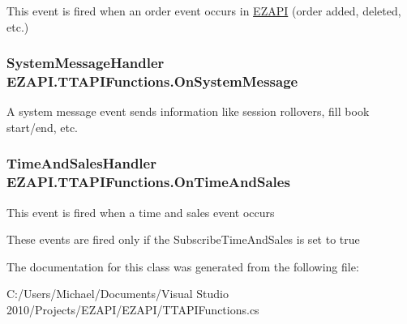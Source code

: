 This event is fired when an order event occurs in \hyperlink{namespace_e_z_a_p_i}{E\-Z\-A\-P\-I} (order added, deleted, etc.) 

\hypertarget{class_e_z_a_p_i_1_1_t_t_a_p_i_functions_a079bc7aa0ce092659ee404fdb2f32583}{
\subsubsection[{On\-System\-Message}]{\setlength{\rightskip}{0pt plus 5cm}System\-Message\-Handler E\-Z\-A\-P\-I.\-T\-T\-A\-P\-I\-Functions.\-On\-System\-Message}}\label{class_e_z_a_p_i_1_1_t_t_a_p_i_functions_a079bc7aa0ce092659ee404fdb2f32583}


A system message event sends information like session rollovers, fill book start/end, etc. 

\hypertarget{class_e_z_a_p_i_1_1_t_t_a_p_i_functions_a9e6460696db8d8d8e9e1723b887c63b7}{
\subsubsection[{On\-Time\-And\-Sales}]{\setlength{\rightskip}{0pt plus 5cm}Time\-And\-Sales\-Handler E\-Z\-A\-P\-I.\-T\-T\-A\-P\-I\-Functions.\-On\-Time\-And\-Sales}}\label{class_e_z_a_p_i_1_1_t_t_a_p_i_functions_a9e6460696db8d8d8e9e1723b887c63b7}


This event is fired when a time and sales event occurs 

These events are fired only if the Subscribe\-Time\-And\-Sales is set to true

The documentation for this class was generated from the following file\-:\begin{DoxyCompactItemize}
\item 
C\-:/\-Users/\-Michael/\-Documents/\-Visual Studio 2010/\-Projects/\-E\-Z\-A\-P\-I/\-E\-Z\-A\-P\-I/T\-T\-A\-P\-I\-Functions.\-cs\end{DoxyCompactItemize}
